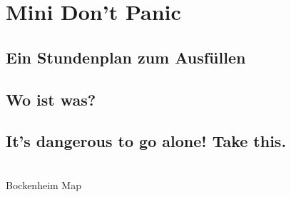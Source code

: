 \documentclass[12pt,a4paper]{scrartcl}
\newcommand*\Newpage{\newpage\null\thispagestyle{empty}\newpage}
\begin{document}
\newpage
\section{Mini Don't Panic}
\subsection*{Ein Stundenplan zum Ausfüllen}

\Newpage



\newpage

\subsection*{Wo ist was?}
    
    \clearpage

\subsection*{ It's dangerous to go alone! Take this. }
    \vspace{2.5cm}
    \begin{center}
    \\Bockenheim Map
    \end{center}
    \pagebreak
\end{document}
